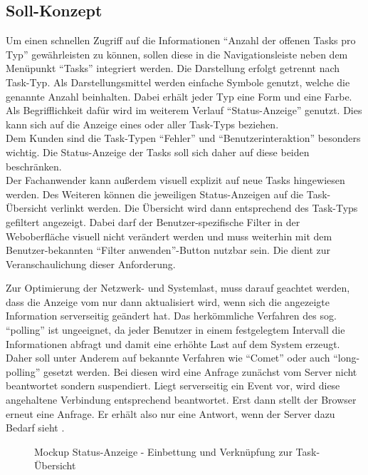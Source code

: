 \subsection{Soll-Konzept} 
\label{sub:Soll-Konzept}
Um einen schnellen Zugriff auf die Informationen "`Anzahl der offenen Tasks pro Typ"' gewährleisten zu können, sollen diese in die
Navigationsleiste neben dem Menüpunkt "`Tasks"' integriert werden. Die Darstellung erfolgt getrennt nach Task-Typ. Als
Darstellungsmittel werden einfache Symbole genutzt, welche die genannte Anzahl beinhalten. Dabei erhält jeder Typ eine Form und
eine Farbe. Als Begrifflichkeit dafür wird im weiterem Verlauf "`Status-Anzeige"' genutzt. Dies kann sich auf die Anzeige eines
oder aller Task-Typs beziehen.\\
Dem Kunden sind die Task-Typen "`Fehler"' und "`Benutzerinteraktion"' besonders wichtig. Die Status-Anzeige der Tasks soll sich
daher auf diese beiden beschränken.\\
Der Fachanwender kann außerdem visuell explizit auf neue Tasks hingewiesen werden. Des Weiteren können die jeweiligen
Status-Anzeigen auf die Task-Übersicht verlinkt werden. Die Übersicht wird dann entsprechend des Task-Typs gefiltert angezeigt.
Dabei darf der Benutzer-spezifische Filter in der Weboberfläche visuell nicht verändert werden und muss weiterhin mit dem
Benutzer-bekannten "`Filter anwenden"'-Button nutzbar sein. Die  dient zur Veranschaulichung dieser
Anforderung.

Zur Optimierung der Netzwerk- und Systemlast, muss darauf geachtet werden, dass die Anzeige vom  nur dann
aktualisiert wird, wenn sich die angezeigte Information serverseitig geändert hat. Das herkömmliche Verfahren des sog.
"`polling"' ist ungeeignet, da jeder Benutzer in einem festgelegtem Intervall die Informationen abfragt und damit eine erhöhte
Last auf dem System erzeugt. Daher soll unter Anderem auf bekannte Verfahren wie "`Comet"' oder auch "`long-polling"' gesetzt
werden. Bei diesen wird eine Anfrage zunächst vom Server nicht beantwortet sondern suspendiert. Liegt serverseitig ein Event vor,
wird diese angehaltene Verbindung entsprechend beantwortet. Erst dann stellt der Browser erneut eine Anfrage. Er erhält also nur
eine Antwort, wenn der Server dazu Bedarf sieht \citep[vgl.][]{HTTPLP}.

\begin{figure}[t]
\centering
{}
\caption{Mockup Status-Anzeige - Einbettung und Verknüpfung zur Task-Übersicht}
\label{app:Mockup} 
\end{figure}

